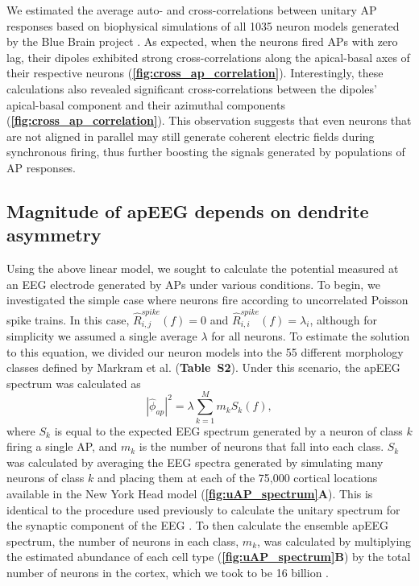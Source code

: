 We estimated the average auto- and cross-correlations between unitary AP responses based on biophysical simulations of all 1035 neuron models generated by the Blue Brain project \cite{Markram2015}. As expected, when the neurons fired APs with zero lag, their dipoles exhibited strong cross-correlations along the apical-basal axes of their respective neurons (\textbf{\autoref{fig:cross_ap_correlation}}). Interestingly, these calculations also revealed significant cross-correlations between the dipoles' apical-basal component and their azimuthal components (\textbf{\autoref{fig:cross_ap_correlation}}). This observation suggests that even neurons that are not aligned in parallel may still generate coherent electric fields during synchronous firing, thus further boosting the signals generated by populations of AP responses.

\subsection{Magnitude of apEEG depends on dendrite asymmetry}
Using the above linear model, we sought to calculate the potential measured at an EEG electrode generated by APs under various conditions. To begin, we investigated the simple case where neurons fire according to uncorrelated Poisson spike trains. In this case, $\hat{R}_{i,j}^{spike}(f)=0$ and $\hat{R}_{i,i}^{spike}(f)=\lambda_i$, although for simplicity we assumed a single average $\lambda$ for all neurons. To estimate the solution to this equation, we divided our neuron models into the 55 different morphology classes defined by Markram et al. \cite{Markram2015} (\textbf{Table~S2}). Under this scenario, the apEEG spectrum was calculated as
\begin{equation} \label{eq:apEEG_spectrum_linear}
    |\hat{\phi}_{ap}|^2 = \lambda \sum_{k=1}^M m_k S_k(f),
\end{equation}
where $S_k$ is equal to the expected EEG spectrum generated by a neuron of class $k$ firing a single AP, and $m_k$ is the number of neurons that fall into each class. $S_k$ was calculated by averaging the EEG spectra generated by simulating many neurons of class $k$ and placing them at each of the 75,000 cortical locations available in the New York Head model \cite{Huang2016} (\textbf{\autoref{fig:uAP_spectrum}A}). This is identical to the procedure used previously to calculate the unitary spectrum for the synaptic component of the EEG \cite{Brake2024}. To then calculate the ensemble apEEG spectrum, the number of neurons in each class, $m_k$, was calculated by multiplying the estimated abundance of each cell type \cite{Markram2015} (\textbf{\autoref{fig:uAP_spectrum}B}) by the total number of neurons in the cortex, which we took to be 16 billion \cite{Azevedo2009}.

